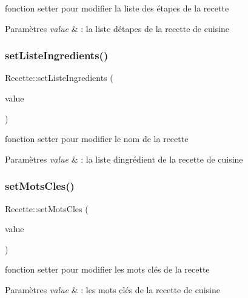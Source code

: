 fonction setter pour modifier la liste des étapes de la recette 


\begin{DoxyParams}{Paramètres}
{\em value} & \+: la liste d\textquotesingle{}étapes de la recette de cuisine \\
\hline
\end{DoxyParams}
\mbox{\label{classRecette_a5d50321b71741def086d7897e2dd62f7}} 
\subsubsection{\texorpdfstring{set\+Liste\+Ingredients()}{setListeIngredients()}}
{\footnotesize\ttfamily Recette\+::set\+Liste\+Ingredients (\begin{DoxyParamCaption}\item[{const Q\+String\+List \&}]{value }\end{DoxyParamCaption})}



fonction setter pour modifier le nom de la recette 


\begin{DoxyParams}{Paramètres}
{\em value} & \+: la liste d\textquotesingle{}ingrédient de la recette de cuisine \\
\hline
\end{DoxyParams}
\mbox{\label{classRecette_a7ccd5aeac86f8ba49831a5ec7d7ad275}} 
\subsubsection{\texorpdfstring{set\+Mots\+Cles()}{setMotsCles()}}
{\footnotesize\ttfamily Recette\+::set\+Mots\+Cles (\begin{DoxyParamCaption}\item[{const Q\+String \&}]{value }\end{DoxyParamCaption})}



fonction setter pour modifier les mots clés de la recette 


\begin{DoxyParams}{Paramètres}
{\em value} & \+: les mots clés de la recette de cuisine \\
\hline
\end{DoxyParams}
\mbox{\label{classRecette_a8c5387d06e11ecfaf827142146ca0b08}} 
